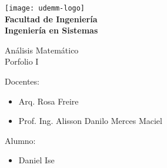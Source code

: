 \begin{titlepage}
	\begin{center}
		\vspace*{0.5cm}
		\texttt{[image: udemm-logo]}\\
		\vspace{0.2cm}
		\Large
		\textbf{Facultad de Ingeniería}\\
		\textbf{Ingeniería en Sistemas}\\
		\vspace{2cm}

		\Huge
		Análisis Matemático\\
		Porfolio I
		\vfill

		\raggedright
		\Large
		Docentes:
		\begin{itemize}
			\item[] Arq. Rosa Freire\\
			\item[] Prof. Ing. Alisson Danilo Merces Maciel\\
		\end{itemize}
		Alumno: 
		\begin{itemize}
			\item[] Daniel Ise
		\end{itemize}
		\vspace{1cm}

	\end{center}
\end{titlepage}
